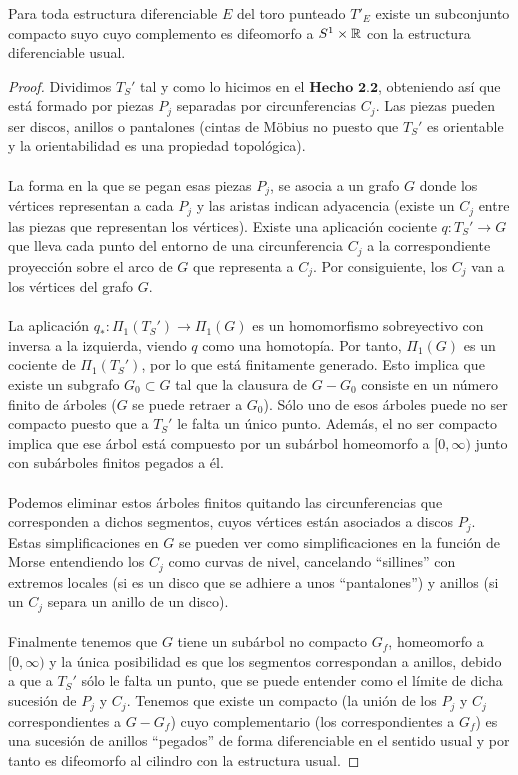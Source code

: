 \begin{hecho}
	Para toda estructura diferenciable $E$ del toro punteado $T'_E$ existe un subconjunto compacto suyo cuyo complemento es difeomorfo a $S^1 \times \mathbb{R}$ con la estructura diferenciable usual.
\end{hecho}

\begin{proof}
	Dividimos $T_S'$ tal y como lo hicimos en el $\textbf{Hecho 2.2}$, obteniendo así que está formado por piezas $P_j$ separadas por circunferencias $C_j$. Las piezas pueden ser discos, anillos o pantalones (cintas de Möbius no puesto que $T_S'$ es orientable y la orientabilidad es una propiedad topológica).\\
	\\ La forma en la que se pegan esas piezas $P_j$, se asocia a un grafo $G$ donde los vértices representan a cada $P_j$ y las aristas indican adyacencia (existe un $C_j$ entre las piezas que representan los vértices). Existe una aplicación cociente $q: T_S' \rightarrow G$ que lleva cada punto del entorno de una circunferencia $C_j$ a la correspondiente proyección sobre el arco de $G$ que representa a $C_j$. Por consiguiente, los $C_j$ van a los vértices del grafo $G$.\\
	\\ La aplicación $q_*:\Pi_1(T_S') \rightarrow \Pi_1(G)$ es un homomorfismo sobreyectivo con inversa a la izquierda, viendo $q$ como una homotopía. Por tanto, $\Pi_1(G)$ es un cociente de $\Pi_1(T_S')$, por lo que está finitamente generado. Esto implica que existe un subgrafo $G_0 \subset G$ tal que la clausura de $G - G_0$ consiste en un número finito de árboles ($G$ se puede retraer a $G_0$). Sólo uno de esos árboles puede no ser compacto puesto que a $T_S'$ le falta un único punto. Además, el no ser compacto implica que ese árbol está compuesto por un subárbol homeomorfo a $[0, \infty)$ junto con subárboles finitos pegados a él.\\
	\\ Podemos eliminar estos árboles finitos quitando las circunferencias que corresponden a dichos segmentos, cuyos vértices están asociados a discos $P_j$. Estas simplificaciones en $G$ se pueden ver como simplificaciones en la función de Morse entendiendo los $C_j$ como curvas de nivel, cancelando ``sillines''  con extremos locales (si es un disco que se adhiere a unos ``pantalones'') y anillos (si un $C_j$ separa un anillo de un disco). \\
	\\ Finalmente tenemos que $G$ tiene un subárbol no compacto $G_f$, homeomorfo a $[0, \infty)$ y la única posibilidad es que los segmentos correspondan a anillos, debido a que a $T_S'$ sólo le falta un punto, que se puede entender como el límite de dicha sucesión de $P_j$ y $C_j$. Tenemos que existe un compacto (la unión de los $P_j$ y $C_j$ correspondientes a $G - G_f$) cuyo complementario (los correspondientes a $G_f$) es una sucesión de anillos ``pegados'' de forma diferenciable en el sentido usual y por tanto es difeomorfo al cilindro con la estructura usual.
\end{proof}

